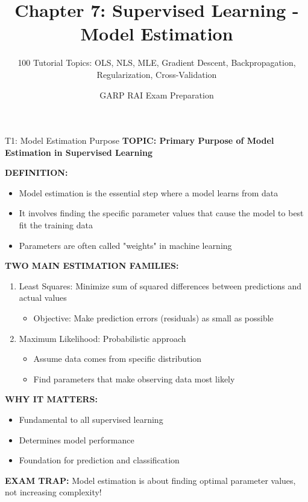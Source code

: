 \documentclass[8pt]{beamer}
\title{Chapter 7: Supervised Learning - Model Estimation}
\subtitle{100 Tutorial Topics: OLS, NLS, MLE, Gradient Descent, Backpropagation, Regularization, Cross-Validation}
\author{GARP RAI Exam Preparation}
\date{}
\begin{document}
	
	\begin{frame}
		\titlepage
	\end{frame}
	
	
	\begin{frame}{T1: Model Estimation Purpose}
		\fontsize{6.5}{7.5}\selectfont
		\textbf{TOPIC: Primary Purpose of Model Estimation in Supervised Learning}
		
		\vspace{0.1cm}
		\textbf{DEFINITION:}
		\begin{itemize}
			\item Model estimation is the essential step where a model learns from data
			\item It involves finding the specific parameter values that cause the model to best fit the training data
			\item Parameters are often called "weights" in machine learning
		\end{itemize}
		
		\vspace{0.1cm}
		\textbf{TWO MAIN ESTIMATION FAMILIES:}
		\begin{enumerate}
			\item \textcolor{myblue}{Least Squares:} Minimize sum of squared differences between predictions and actual values
			\begin{itemize}
				\item Objective: Make prediction errors (residuals) as small as possible
			\end{itemize}
			\item \textcolor{myblue}{Maximum Likelihood:} Probabilistic approach
			\begin{itemize}
				\item Assume data comes from specific distribution
				\item Find parameters that make observing data most likely
			\end{itemize}
		\end{enumerate}
		
		\vspace{0.1cm}
		\textbf{WHY IT MATTERS:}
		\begin{itemize}
			\item Fundamental to all supervised learning
			\item Determines model performance
			\item Foundation for prediction and classification
		\end{itemize}
		
		\textcolor{myred}{\textbf{EXAM TRAP:}} Model estimation is about finding \textcolor{myblue}{optimal parameter values}, not increasing complexity!
	\end{frame}
	
\end{document}

